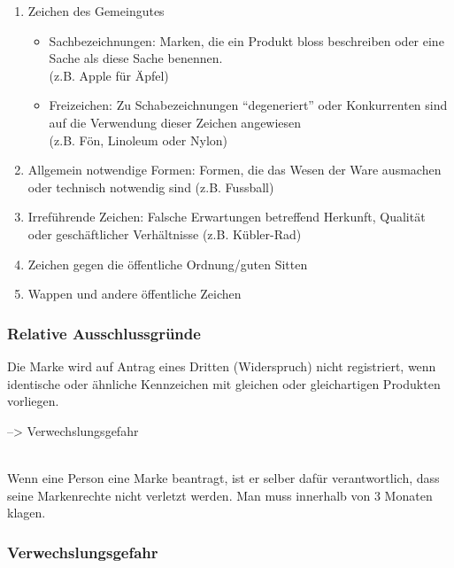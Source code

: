 \begin{enumerate}
	\tightlist
	\item Zeichen des Gemeingutes
	\begin{itemize}
		\tightlist
		\item Sachbezeichnungen: Marken, die ein Produkt bloss beschreiben oder
		eine Sache als diese Sache benennen.\\
		(z.B. Apple für Äpfel)
		\item Freizeichen: Zu Schabezeichnungen ``degeneriert'' oder Konkurrenten
		sind auf die Verwendung dieser Zeichen angewiesen\\
		(z.B. Fön, Linoleum oder Nylon)
	\end{itemize}
	\item Allgemein notwendige Formen: Formen, die das Wesen der Ware ausmachen
	oder technisch notwendig sind (z.B. Fussball)
	\item Irreführende Zeichen: Falsche Erwartungen betreffend Herkunft,
	Qualität oder geschäftlicher Verhältnisse (z.B. Kübler-Rad)
	\item Zeichen gegen die öffentliche Ordnung/guten Sitten
	\item Wappen und andere öffentliche Zeichen
\end{enumerate}

\subsubsection{Relative Ausschlussgründe}

Die Marke wird auf Antrag eines Dritten (Widerspruch) nicht registriert,
wenn identische oder ähnliche Kennzeichen mit gleichen oder
gleichartigen Produkten vorliegen.

--> Verwechslungsgefahr

\mbox{}\\
Wenn eine Person eine Marke beantragt, ist er selber dafür
verantwortlich, dass seine Markenrechte nicht verletzt werden. Man muss
innerhalb von 3 Monaten klagen.


\subsubsection{Verwechslungsgefahr}

